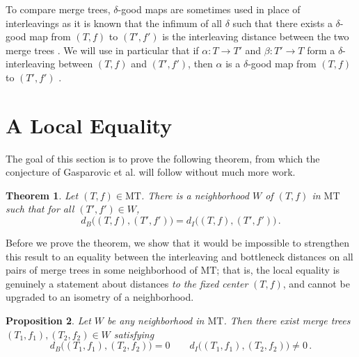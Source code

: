 \documentclass{article}
\newtheorem{theorem}{Theorem}
\newtheorem{proposition}[theorem]{Proposition}
\theoremstyle{definition}
\newcommand{\MT}{\mathrm{MT}}
\begin{document}
To compare merge trees, $\delta$-good maps are sometimes used in place of interleavings as it is known that the infimum of all $\delta$ such that there exists a $\delta$-good map from $(T,f)$ to $(T',f')$ is the interleaving distance between the two merge trees \cite{touli2022fpt}. We will use in particular that if $\alpha:T\to T'$ and $\beta:T' \to T$ form a $\delta$-interleaving between $(T,f)$ and $(T',f')$, then $\alpha$ is a $\delta$-good map from $(T,f)$ to $(T',f')$ \cite[Lemma 1]{touli2022fpt}.

\section{A Local Equality}
\label{sec:loceq}

The goal of this section is to prove the following theorem, from which the conjecture of Gasparovic et al. will follow without much more work.

\begin{theorem}
    \label{thm:localeq}
    Let $(T,f)\in\MT$. There is a neighborhood $W$ of $(T,f)$ in $\MT$ such that for all $(T',f')\in W$,
    \begin{equation*}
        d_B\big((T,f),(T',f')\big) = d_I\big((T,f),(T',f')\big)\,.
    \end{equation*}
\end{theorem}

Before we prove the theorem, we show that it would be impossible to strengthen this result to an equality between the interleaving and bottleneck distances on all pairs of merge trees in some neighborhood of $\MT$; that is, the local equality is genuinely a statement about distances \emph{to the fixed center} $(T,f)$, and cannot be upgraded to an isometry of a neighborhood.

\begin{proposition}\label{prop:no_isometry}
    Let $W$ be any neighborhood in $\MT$. Then there exist merge trees $(T_1,f_1), (T_2,f_2)\in W$ satisfying
    \begin{equation*}
        d_B\big((T_1,f_1), (T_2,f_2)\big) = 0 \qquad d_I\big((T_1,f_1), (T_2,f_2)\big) \neq 0\,.
    \end{equation*}
\end{proposition}
\end{document}
